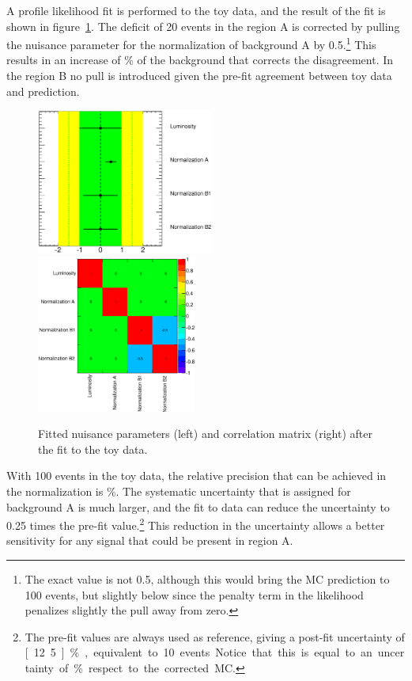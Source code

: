    A profile likelihood fit is performed to the toy data, and the result of the fit is shown in figure~\ref{fig:toy_result}. The deficit of 20 events in the region A is corrected by pulling the nuisance parameter for the normalization of background A by 0.5.\footnote{The exact value is not 0.5, although this would bring the MC prediction to 100 events, but slightly below since the penalty term in the likelihood penalizes slightly the pull away from zero. } 
   This results in an increase of \unit[25]{\%} of the background that corrects the disagreement. In the region B no pull is introduced given the pre-fit agreement between toy data and prediction.

   \begin{figure}[tb!]
     \centering
     \includegraphics[valign=t, width=0.52\textwidth]{Statistics/Figures/fitexample/toyFit.eps}
     \includegraphics[valign=t, width=0.47\textwidth]{Statistics/Figures/fitexample/toyCorr.eps}
     \caption{Fitted nuisance parameters (left) and correlation matrix (right) after the fit to the toy data. }
     \label{fig:toy_result}
   \end{figure}

   With 100 events in the toy data, the relative precision that can be achieved in the normalization is \unit[10]{\%}. The systematic uncertainty that is assigned for background A is much larger, and the fit to data can reduce the uncertainty to 0.25 times the pre-fit value.\footnote{The pre-fit values are always used as reference, giving a post-fit uncertainty of \unit[12.5]{\%}, equivalent to 10 events. Notice that this is equal to an uncertainty of \unit[10]{\%} respect to the corrected MC.} This reduction in the uncertainty allows a better sensitivity for any signal that could be present in region A.


